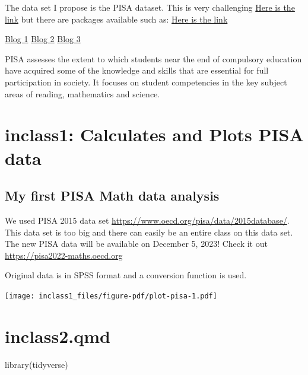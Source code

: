\documentclass[
  letterpaper,
  DIV=11,
  numbers=noendperiod]{scrreprt}
\newenvironment{Shaded}{\begin{snugshade}}{\end{snugshade}}
\newcommand{\FunctionTok}[1]{\textcolor[rgb]{0.28,0.35,0.67}{#1}}
\newcommand{\NormalTok}[1]{\textcolor[rgb]{0.00,0.23,0.31}{#1}}
\begin{document}
The data set I propose is the PISA dataset. This is very challenging
\href{https://www.oecd.org/pisa/data/2015database/}{Here is the link}
but there are packages available such as:
\href{https://github.com/eldafani/intsvy}{Here is the link}

\href{https://www.r-bloggers.com/2016/12/pisa-2015-how-to-readprocessplot-the-data-with-r/}{Blog
1}
\href{https://www.r-bloggers.com/2015/06/analyze-the-trends-in-international-mathematics-and-science-study-timss-with-r/}{Blog
2}
\href{https://cran.r-project.org/web/packages/eeptools/vignettes/intro.html}{Blog
3}

PISA assesses the extent to which students near the end of compulsory
education have acquired some of the knowledge and skills that are
essential for full participation in society. It focuses on student
competencies in the key subject areas of reading, mathematics and
science.


\hypertarget{inclass1-calculates-and-plots-pisa-data}{%
\chapter{inclass1: Calculates and Plots PISA
data}\label{inclass1-calculates-and-plots-pisa-data}}

\hypertarget{my-first-pisa-math-data-analysis}{%
\section{My first PISA Math data
analysis}\label{my-first-pisa-math-data-analysis}}

We used PISA 2015 data set
\url{https://www.oecd.org/pisa/data/2015database/}. This data set is too
big and there can easily be an entire class on this data set. The new
PISA data will be available on December 5, 2023! Check it out
\url{https://pisa2022-maths.oecd.org}

Original data is in SPSS format and a conversion function is used.

\texttt{[image: inclass1\_files/figure-pdf/plot-pisa-1.pdf]}


\hypertarget{inclass2.qmd}{%
\chapter{inclass2.qmd}\label{inclass2.qmd}}

\begin{Shaded}
\begin{Highlighting}[]
\FunctionTok{library}\NormalTok{(tidyverse)}
\end{Highlighting}
\end{Shaded}
\end{document}

